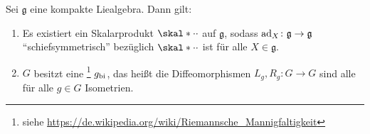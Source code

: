 \begin{lemma}[{name=[Existenz schöner Skalarprodukte und biinvarianter Metriken]}]
	Sei $\mathfrak{g}$ eine kompakte Liealgebra.
	Dann gilt:
	\begin{enumerate}[1)]
		\item Es existiert ein Skalarprodukt $\skal*{\cdot}{\cdot}$ auf $\mathfrak{g}$, sodass $\operatorname{ad}_X \colon \mathfrak{g} \to \mathfrak{g}$ \enquote{schiefsymmetrisch} bezüglich $\skal*{\cdot}{\cdot}$ ist für alle $X \in \mathfrak{g}$.
		\item $G$ besitzt eine \footnote{siehe \url{https://de.wikipedia.org/wiki/Riemannsche_Mannigfaltigkeit}} $g_{\mathrm{bi}}$, das heißt die Diffeomorphismen $L_g,R_g \colon G \to G$ sind alle für alle $g \in G$ Isometrien.
	\end{enumerate}
\end{lemma}
